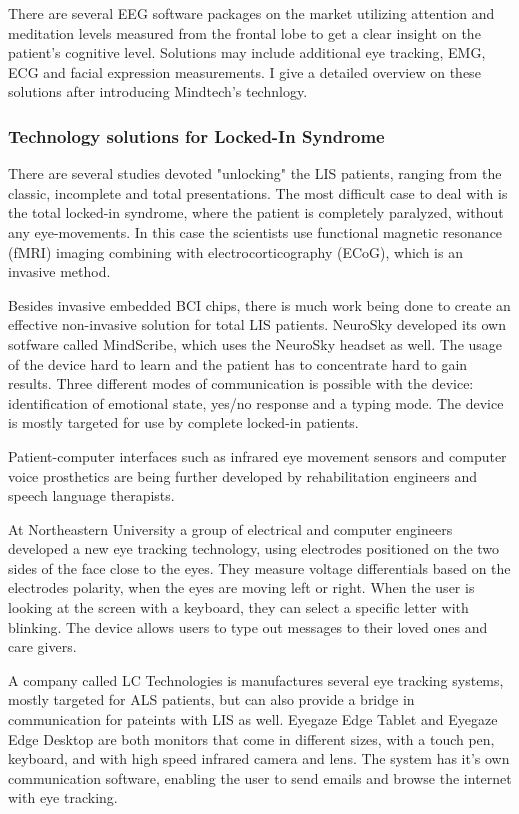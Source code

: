 \documentclass[letterpaper,10pt]{article}
\begin{document}
There are several EEG software packages on the market utilizing attention and meditation levels measured from the frontal lobe to get a clear insight on the patient's cognitive level. Solutions may include additional eye tracking, EMG, ECG and facial expression measurements. I give a detailed overview on these solutions after introducing Mindtech's technlogy.


\subsubsection{Technology solutions for Locked-In Syndrome}

There are several studies devoted "unlocking" the LIS patients, ranging from the classic, incomplete and total presentations. The most difficult case to deal with is the total locked-in syndrome, where the patient is completely paralyzed, without any eye-movements. In this case the scientists use functional magnetic resonance (fMRI) imaging combining with electrocorticography (ECoG), which is an invasive method.  

Besides invasive embedded BCI chips, there is much work being done to create an effective non-invasive solution for total LIS patients. NeuroSky developed its own sotfware called MindScribe, which uses the NeuroSky headset as well. The usage of the device hard to learn and the patient has to concentrate hard to gain results. Three different modes of communication is possible with the device: identification of emotional state, yes/no response and a typing mode. The device is mostly targeted for use by complete locked-in patients. 
\cite{mannes_2016}


Patient-computer interfaces such as infrared eye movement sensors and computer voice prosthetics are being further developed by rehabilitation engineers and speech language therapists. \cite{smith_delargy_2005}

At Northeastern University a group of electrical and computer engineers developed a new eye tracking technology, using electrodes positioned on the two sides of the face close to the eyes. They measure voltage differentials based on the electrodes polarity, when the eyes are moving left or right. When the user is looking at the screen with a keyboard, they can select a specific letter with blinking. The device allows users to type out messages to their loved ones and care givers. \cite{neu}

A company called LC Technologies is manufactures several eye tracking systems, mostly targeted for ALS patients, but can also provide a bridge in communication for pateints with LIS as well. Eyegaze Edge Tablet and Eyegaze Edge Desktop are both monitors that come in different sizes, with a touch pen, keyboard, and with high speed infrared camera and lens. The system has it's own communication software, enabling the user to send emails and browse the internet with eye tracking. \cite{yusuf}
\end{document}
